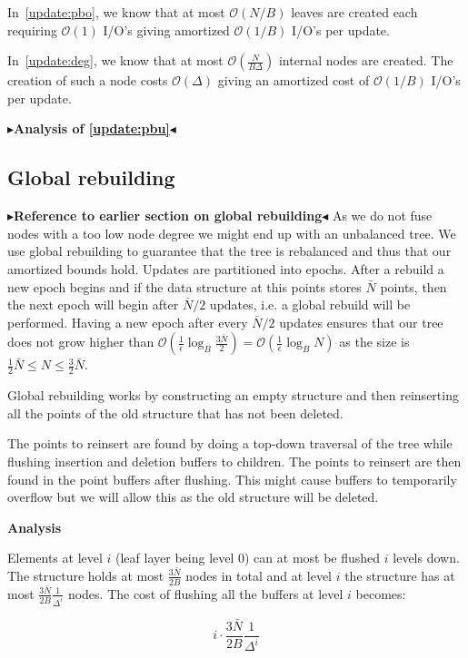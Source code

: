\documentclass[twoside,11pt,openright]{report}
\newcommand{\todo}[1]{{\color[rgb]{.5,0,0}\textbf{$\blacktriangleright$#1$\blacktriangleleft$}}}
\begin{document}
In~\ref{update:pbo}, we know that at most $\mathcal{O}(N/B)$ leaves are created each requiring $\mathcal{O}(1)$ I/O's giving amortized $\mathcal{O}(1/B)$ I/O's per update.

In~\ref{update:deg}, we know that at most $\mathcal{O}(\frac{N}{B\Delta})$ internal nodes are created. The creation of such a node costs $\mathcal{O}(\Delta)$ giving an amortized cost of $\mathcal{O}(1/B)$ I/O's per update.

\todo{Analysis of \ref{update:pbu}}

\subsection{Global rebuilding}
\todo{Reference to earlier section on global rebuilding}
As we do not fuse nodes with a too low node degree we might end up with an unbalanced tree. We use global rebuilding to guarantee that the tree is rebalanced and thus that our amortized bounds hold.
Updates are partitioned into epochs. After a rebuild a new epoch begins and if the data structure at this points stores $\bar{N}$ points, then the next epoch will begin after $\bar{N}/2$ updates, i.e. a global rebuild will be performed.
Having a new epoch after every $\bar{N}/2$ updates ensures that our tree does not grow higher than $\mathcal{O}\left(\frac{1}{\epsilon}\log_B\frac{3\bar{N}}{2}\right) = \mathcal{O}\left(\frac{1}{\epsilon}\log_B N\right)$ as the size is $\frac{1}{2}\bar{N} \leq N \leq \frac{3}{2}\bar{N}$.

Global rebuilding works by constructing an empty structure and then reinserting all the points of the old structure that has not been deleted.

The points to reinsert are found by doing a top-down traversal of the tree while flushing insertion and deletion buffers to children. The points to reinsert are then found in the point buffers after flushing. This might cause buffers to temporarily overflow but we will allow this as the old structure will be deleted.

\textbf{Analysis}

Elements at level $i$ (leaf layer being level 0) can at most be flushed $i$ levels down.
The structure holds at most $\frac{3\bar{N}}{2B}$ nodes in total and at level $i$ the structure has at most $\frac{3\bar{N}}{2B} \frac{1}{\Delta^i}$ nodes. The cost of flushing all the buffers at level $i$ becomes:

$$ i \cdot \frac{3\bar{N}}{2B} \frac{1}{\Delta^i}$$
\end{document}
